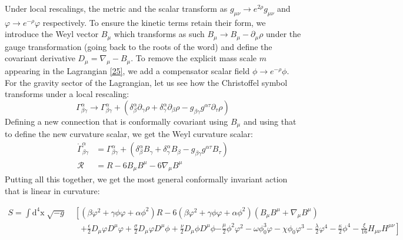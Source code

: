 \documentclass[aps,prd,reprint,preprintnumbers,showpacs,floatfix,nofootinbib,superscript address]{revtex4-2}
\begin{document}
Under local rescalings, the metric and the scalar transform as $g_{\mu\nu} \rightarrow e^{2\rho} g_{\mu\nu} $ and  $\varphi \rightarrow e^{-\rho}\varphi$ respectively. To ensure the kinetic terms retain their form, we introduce the Weyl vector $B_\mu$ which transforms as such $B_{\mu} \rightarrow B_\mu - \partial_\mu \rho$ under the gauge transformation (going back to the roots of the word) and define the covariant derivative $D_\mu = \nabla_\mu - B_\mu$. To remove the explicit mass scale $m$ appearing in the Lagrangian \ref{25}, we add a compensator scalar field $\phi \rightarrow e^{-\rho}\phi$. For the gravity sector of the Lagrangian, let us see how the Christoffel symbol transforms under a local rescaling:
\begin{equation}
    \Gamma^{\alpha}_{\beta \gamma} \rightarrow \Gamma^{\alpha}_{\beta \gamma} +(\delta^{\alpha}_{\beta} \partial_\gamma \rho + \delta^{\alpha}_{\gamma} \partial_{\beta} \rho - g_{\beta \gamma}g^{\alpha \tau}\partial_{\tau}\rho)
\end{equation}
Defining a new connection that is conformally covariant using $B_\mu$ and using that to define the new curvature scalar, we get the Weyl curvature scalar:
\begin{align}
    \mathring{\Gamma}^{\alpha}_{\beta \gamma} &= \Gamma^{\alpha}_{\beta \gamma} + (\delta^{\alpha}_{\beta} B_{\gamma} + \delta^{\alpha}_{\gamma} B_{\beta} - g_{\beta \gamma}g^{\alpha \tau}B_{\tau}) \nonumber \\
    \mathcal{R} &= R - 6 B_{\mu} B^{\mu} - 6 \nabla_\mu B^\mu
\end{align}
Putting all this together, we get the most general conformally invariant action that is linear in curvature:
\begin{widetext} 
\begin{subequations} \label{Starting Action}
\begin{align}
    S =\int \text{d}^4\text{x} \; \sqrt{-g} &\; \left[ ( \beta \varphi^2 + \gamma \phi \varphi +\alpha \phi^2) R - 6( \beta \varphi^2 + \gamma \phi \varphi +\alpha \phi^2) (B_{\mu} B^{\mu} + \nabla_\mu B^\mu) \right. \nonumber \\
    &\quad \left. +\frac{\epsilon}{2} D_{\mu}\varphi D^{\mu}\varphi + \frac{\sigma}{2} D_{\mu}\varphi D^{\mu}\phi + \frac{\nu}{2} D_{\mu}\phi D^{\mu}\phi \right. \left. - \frac{\mu}{2} \phi^2 \varphi^2 - \omega \phi_0^3 \varphi - \chi \phi_0 \varphi^3 - \frac{\lambda}{2} \varphi^4 - \frac{\kappa}{2} \phi^4 - \frac{\xi}{16} H_{\mu\nu}H^{\mu\nu} \right]  
\end{align}
\end{subequations}
\end{widetext}
\end{document}
